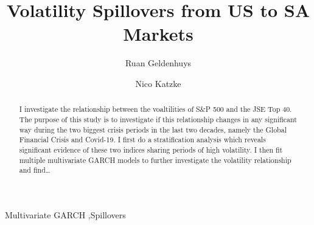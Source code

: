 \documentclass[11pt,preprint, authoryear]{elsarticle}
\numberwithin{equation}{section}
\numberwithin{figure}{section}
\numberwithin{table}{section}
\begin{document}
\begin{frontmatter}  %

\title{Volatility Spillovers from US to SA Markets}





\author[Add1]{Ruan Geldenhuys}

\author[Add1,Add2]{Nico Katzke}




\address[Add1]{Stellenbosch University, Stellenbosch, South Africa}
\address[Add2]{Stellenbosch University, Stellenbosch, South Africa}


\begin{abstract}
\small{
I investigate the relationship between the voaltilities of S\&P 500 and
the JSE Top 40. The purpose of this study is to investigate if this
relationship changes in any significant way during the two biggest
crisis periods in the last two decades, namely the Global Financial
Crisis and Covid-19. I first do a stratification analysis which reveals
significant evidence of these two indices sharing periods of high
volatility. I then fit multiple multivariate GARCH models to further
investigate the volatility relationship and find\ldots{}
}
\end{abstract}

\vspace{1cm}


\begin{keyword}
\footnotesize{
Multivariate GARCH \sep Spillovers \\
\vspace{0.3cm}
}
\end{keyword}



\vspace{0.5cm}

\end{frontmatter}

\setcounter{footnote}{0}



\pagestyle{fancy}
\chead{}
\rhead{}
\lfoot{}
\lhead{}
\cfoot{}

\end{document}
